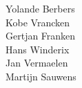\flushright{}
Yolande Berbers\\
Kobe Vrancken\\
Gertjan Franken\\
Hans Winderix\\
Jan Vermaelen\\
Martijn Sauwens\\
